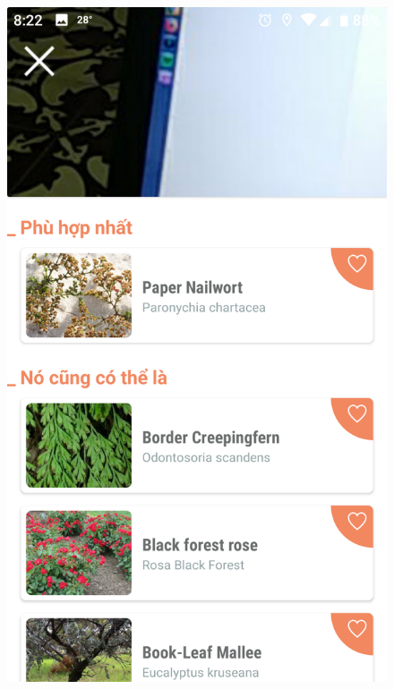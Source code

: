 \documentclass[12pt]{report}
\begin{document}
		\begin{figure}[h]
			\centering
			\includegraphics[scale=0.13]{app_detect1}

\end{figure}
\end{document}
